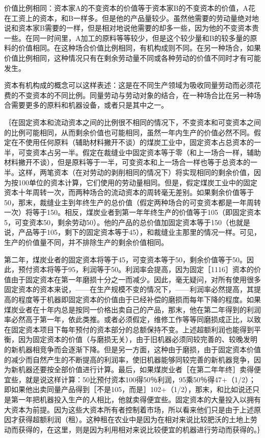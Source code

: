 价值比例相同：资本家A的不变资本的价值等于资本家B的不变资本的价值，A花在工资上的资本，和B一样多。但是他的产品量较少。虽然他需要的劳动量绝对地说和资本家B需要的一样，但是相对地说他需要的却多一些，因为他的不变资本贵一些。在同一时间里，A加工的原料等等较少，但是这个较少量和B的较多量的原料的价值相同。在这种场合价值比例相同，有机构成则不同。在另一种场合，如果价值比例相同，这种情况只有在剩余劳动量不同或各种劳动的价值不同时才有可能发生。

资本有机构成的概念可以这样表述：这是在不同生产领域为吸收同量劳动而必须花费的不变资本的不同比例。同量劳动与劳动对象的结合，在一种场合比在另一种场合需要更多的原料和机器设备，或者只是其中之一。

｛在固定资本和流动资本之间的比例很不相同的情况下，不变资本和可变资本之间的比例可能相同，从而剩余价值也可能相同，虽然一年内生产的价值必然不同。假定在不使用任何原料（辅助材料撇开不谈）的煤炭工业中，固定资本占总资本的一半，可变资本占另一半。假定在裁缝业中固定资本等于零（和上一场合一样，辅助材料撇开不谈），但是原料等于一半，可变资本和上一场合一样也等于总资本的一半。这样，两笔资本（在对劳动的剥削相同的情况下）将实现相同的剩余价值，因为按100单位的资本计算，它们使用的劳动量相同。但是，假定煤炭工业中的固定资本十年周转一次，而两种场合的流动资本的周转毫无差别。如果剩余价值等于50，那末，裁缝业主到年终生产的总价值（假定两种场合的可变资本都是一年周转一次）将等于150。相反，煤炭业者到第一年年终生产的价值等于105（即固定资本5，可变资本50，剩余劳动50）。他的产品的总价值加固定资本等于150（也就是说，产品等于105，剩下的固定资本等于45），和裁缝业主那里的情况一样。可见，生产的价值量不同，并不排除生产的剩余价值相同。

第二年，煤炭业者的固定资本将等于45，可变资本等于50，剩余价值等于50。因此，预付资本将等于95，利润等于50。利润率会提高，因为固定［1116］资本的价值由于固定资本在第一年磨损十分之一而减少。因此，毫无疑问，对所有使用很多固定资本的资本来说，——在生产规模不变的情况下，——利润率必然提高，其提高的程度等于机器即固定资本的价值由于已经补偿的磨损而每年下降的程度。如果煤炭业者在十年内总是按同一价格出卖自己的产品，那末，他在第二年得到的利润率必然高于第一年，依此类推。或者必须假定，维修工作等等同磨损成正比，以致在固定资本项目下每年预付的资本部分的总额保持不变。上述超额利润也能得到平衡，因为固定资本的价值（与磨损无关），由于旧机器必须同较完善的、较晚发明的新机器相竞争而会逐渐下降。但是另一方面，这种由于磨损，由于固定资本价值的减少而自然产生的不断提高的利润率，使旧机器能够同较完善的新机器竞争，因为新机器还要按全部价值进行计算。最后，如果煤炭业者［在第二年年终］卖得便宜些，就是说这样计算：50比预付资本100得50％利润，95乘50％得47+（1/2）；即如果他出卖同量产品得到［不是105，而是］102+（1/2），那末，和比如说还只是第一年把机器投入生产的人相比，他就卖得便宜些。固定资本的大量投入以拥有大资本为前提。因为这些大资本所有者控制着市场，所以看来他们只是由于上述原因才获得超额利润（租）。这种租在农业中是因为在相对来说比较肥沃的土地上劳动而获得的，在这里，则是因为利用相对来说比较便宜的机器进行劳动而获得的。｝

